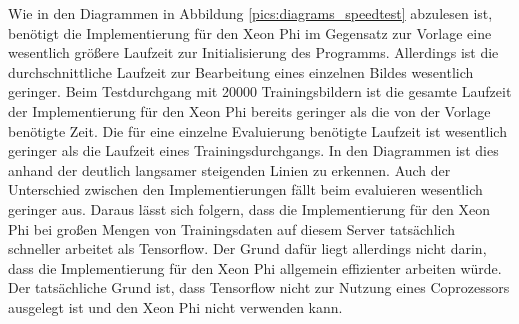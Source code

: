 \documentclass[../main.tex]{subfiles}
\begin{document}
Wie in den Diagrammen in Abbildung \ref{pics:diagrams_speedtest} abzulesen ist, benötigt die Implementierung für den Xeon Phi im Gegensatz zur Vorlage eine wesentlich größere Laufzeit zur Initialisierung des Programms. Allerdings ist die durchschnittliche Laufzeit zur Bearbeitung eines einzelnen Bildes wesentlich geringer. Beim Testdurchgang mit 20000 Trainingsbildern ist die gesamte Laufzeit der Implementierung für den Xeon Phi bereits geringer als die von der Vorlage benötigte Zeit. Die für eine einzelne Evaluierung benötigte Laufzeit ist wesentlich geringer als die Laufzeit eines Trainingsdurchgangs. In den Diagrammen ist dies anhand der deutlich langsamer steigenden Linien zu erkennen. Auch der Unterschied zwischen den Implementierungen fällt beim evaluieren wesentlich geringer aus. Daraus lässt sich folgern, dass die Implementierung für den Xeon Phi bei großen Mengen von Trainingsdaten auf diesem Server tatsächlich schneller arbeitet als Tensorflow. Der Grund dafür liegt allerdings nicht darin, dass die Implementierung für den Xeon Phi allgemein effizienter arbeiten würde. Der tatsächliche Grund ist, dass Tensorflow nicht zur Nutzung eines Coprozessors ausgelegt ist und den Xeon Phi nicht verwenden kann. 
\end{document}
